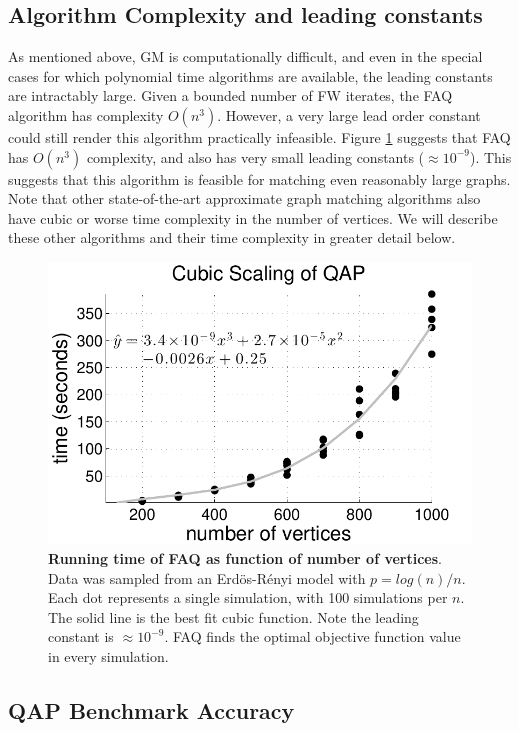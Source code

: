 \documentclass[10pt]{article}
\begin{document}
\subsection{Algorithm Complexity and leading constants} %
\label{sub:const}

As mentioned above, GM is computationally difficult, and even in the special cases for which polynomial time algorithms are available, the leading constants are intractably large. Given a bounded number of FW iterates, the FAQ algorithm has complexity $O(n^3)$.  However, a very large lead order constant could still render this algorithm practically infeasible.  
Figure \ref{fig:scaling} suggests that FAQ has $O(n^3)$ complexity, and also has very small leading constants ($\approx 10^{-9}$). 
This suggests that this algorithm is feasible for matching even reasonably large graphs.  Note that other state-of-the-art approximate graph matching algorithms also have cubic or worse time complexity in the number of vertices.  We will describe these other algorithms and their time complexity in greater detail below.

\begin{figure}[htbp]
	\centering			
	\includegraphics[width=0.7\linewidth]{Figure1.pdf}
	\caption{{\bf Running time of FAQ as function of number of vertices}. Data was sampled from an Erd\"os-R\'enyi model with $p=log(n)/n$.  Each dot represents a single simulation, with 100 simulations per $n$.  The solid line is the best fit cubic function.  Note the leading constant is $\approx 10^{-9}$. FAQ finds the optimal objective function value in every simulation.}
	\label{fig:scaling}
\end{figure}


\subsection{QAP Benchmark Accuracy} 
\label{sub:qap_benchmarks}
\end{document}
